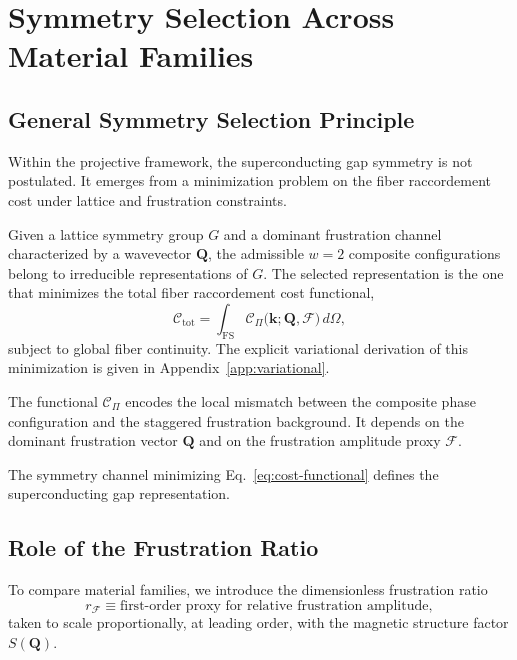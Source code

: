 \section{Symmetry Selection Across Material Families}
  \label{sec:symmetry-selection-families}

  \subsection{General Symmetry Selection Principle}
    \label{subsec:general-selection}

    Within the projective framework,
    the superconducting gap symmetry is not postulated.
    It emerges from a minimization problem on the fiber
    raccordement cost under lattice and frustration constraints.

    Given a lattice symmetry group $G$
    and a dominant frustration channel characterized by
    a wavevector $\mathbf{Q}$,
    the admissible $w=2$ composite configurations
    belong to irreducible representations of $G$.
    The selected representation is the one that minimizes
    the total fiber raccordement cost functional,
    \begin{equation}
      \mathcal{C}_{\text{tot}}
      =
      \int_{\text{FS}}
      \mathcal{C}_{\Pi}
      \big(
      \mathbf{k};
      \mathbf{Q},
      \mathcal{F}
      \big)
      \, d\Omega ,
      \label{eq:cost-functional}
    \end{equation}
    subject to global fiber continuity.
    The explicit variational derivation of this minimization
    is given in Appendix~\ref{app:variational}.

    The functional $\mathcal{C}_{\Pi}$
    encodes the local mismatch between
    the composite phase configuration
    and the staggered frustration background.
    It depends on the dominant frustration vector $\mathbf{Q}$
    and on the frustration amplitude proxy $\mathcal{F}$.

    The symmetry channel minimizing Eq.~\ref{eq:cost-functional}
    defines the superconducting gap representation.

  \subsection{Role of the Frustration Ratio}
    \label{subsec:role-rF}

    To compare material families,
    we introduce the dimensionless frustration ratio
    \begin{equation}
      r_{\mathcal F}
      \equiv
      \text{first-order proxy for relative frustration amplitude},
      \label{eq:rF-definition}
    \end{equation}
    taken to scale proportionally,
    at leading order,
    with the magnetic structure factor $S(\mathbf{Q})$.

